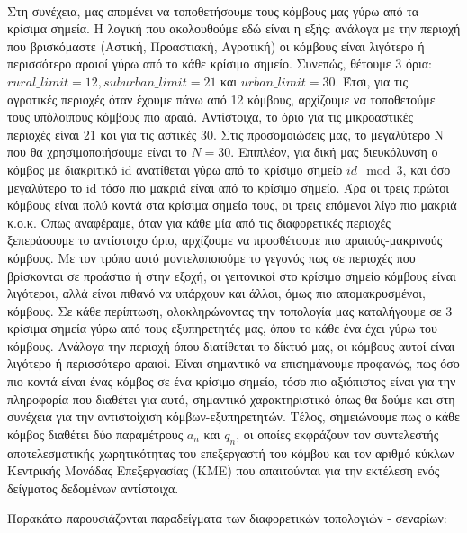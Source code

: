 \vspace{-0.5cm}

\paragraph{}Στη συνέχεια, μας απομένει να τοποθετήσουμε τους κόμβους μας γύρω από τα κρίσιμα σημεία. Η λογική που ακολουθούμε εδώ είναι η εξής: ανάλογα με την περιοχή που βρισκόμαστε (Αστική, Προαστιακή, Αγροτική) οι κόμβους είναι λιγότερο ή περισσότερο αραιοί γύρω από το κάθε κρίσιμο σημείο. Συνεπώς, θέτουμε 3 όρια: $rural\_limit = 12, suburban\_limit = 21$ και $urban\_limit = 30$. Έτσι, για τις αγροτικές περιοχές όταν έχουμε πάνω από 12 κόμβους, αρχίζουμε να τοποθετούμε τους υπόλοιπους κόμβους πιο αραιά. Αντίστοιχα, το όριο για τις μικροαστικές περιοχές είναι 21 και για τις αστικές 30. Στις προσομοιώσεις μας, το μεγαλύτερο Ν που θα χρησιμοποιήσουμε είναι το $N = 30$. Επιπλέον, για δική μας διευκόλυνση ο κόμβος με διακριτικό id ανατίθεται γύρω από το κρίσιμο σημείο $id\mod3$, και όσο μεγαλύτερο το id τόσο πιο μακριά είναι από το κρίσιμο σημείο. Άρα οι τρεις πρώτοι κόμβους είναι πολύ κοντά στα κρίσιμα σημεία τους, οι τρεις επόμενοι λίγο πιο μακριά κ.ο.κ. Όπως αναφέραμε, όταν για κάθε μία από τις διαφορετικές περιοχές ξεπεράσουμε το αντίστοιχο όριο, αρχίζουμε να προσθέτουμε πιο αραιούς-μακρινούς κόμβους. Με τον τρόπο αυτό μοντελοποιούμε το γεγονός πως σε περιοχές που βρίσκονται σε προάστια ή στην εξοχή, οι γειτονικοί στο κρίσιμο σημείο κόμβους είναι λιγότεροι, αλλά είναι πιθανό να υπάρχουν και άλλοι, όμως πιο απομακρυσμένοι, κόμβους. Σε κάθε περίπτωση, ολοκληρώνοντας την τοπολογία μας καταλήγουμε σε 3 κρίσιμα σημεία γύρω από τους εξυπηρετητές μας, όπου το κάθε ένα έχει γύρω του κόμβους. Ανάλογα την περιοχή όπου διατίθεται το δίκτυό μας, οι κόμβους αυτοί είναι λιγότερο ή περισσότερο αραιοί. Είναι σημαντικό να επισημάνουμε προφανώς, πως όσο πιο κοντά είναι ένας κόμβος σε ένα κρίσιμο σημείο, τόσο πιο αξιόπιστος είναι για την πληροφορία που διαθέτει για αυτό, σημαντικό χαρακτηριστικό όπως θα δούμε και στη συνέχεια για την αντιστοίχιση κόμβων-εξυπηρετητών. Τέλος, σημειώνουμε πως ο κάθε κόμβος διαθέτει δύο παραμέτρους $a_n$ και $q_n$, οι οποίες εκφράζουν τον συντελεστής αποτελεσματικής χωρητικότητας του επεξεργαστή του κόμβου και τον αριθμό κύκλων Κεντρικής Μονάδας Επεξεργασίας (ΚΜΕ) που απαιτούνται για την εκτέλεση ενός δείγματος δεδομένων αντίστοιχα.

\newpage

Παρακάτω παρουσιάζονται παραδείγματα των διαφορετικών τοπολογιών - σεναρίων: 

